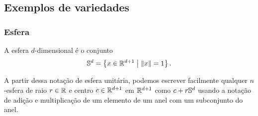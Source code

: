 \subsection{Exemplos de variedades}

\subsubsection{Esfera}

A esfera $d$-dimensional é o conjunto
	\begin{equation*}
	\S^d = \set{x \in \R^{d+1}}{\nor{x}=1}.
	\end{equation*}

A partir dessa notação de esfera unitária, podemos escrever facilmente qualquer $n$-esfera de raio $r \in \R$ e centro $c \in \R^{d+1}$ em $\R^{d+1}$ como $c + r\S^d$ usando a notação de adição e multiplicação de um elemento de um anel com um subconjunto do anel.

